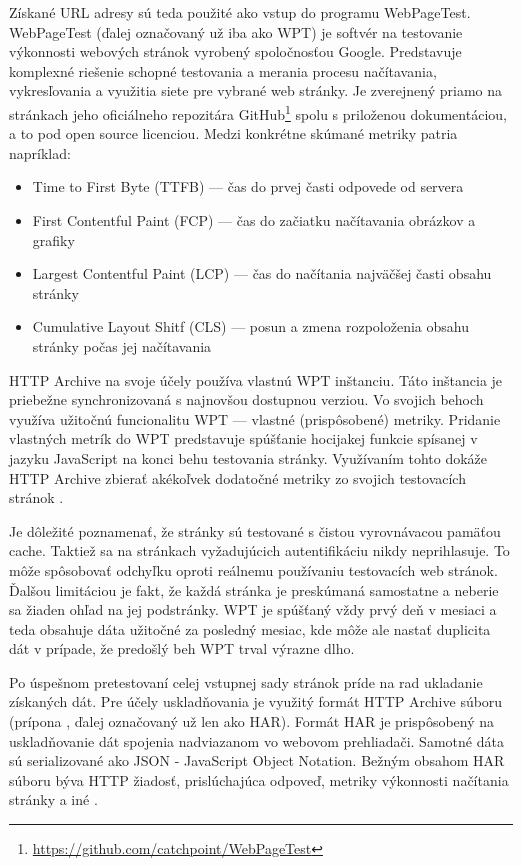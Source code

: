 Získané URL adresy sú teda použité ako vstup do programu WebPageTest. WebPageTest (ďalej označovaný už iba ako WPT) je softvér na testovanie výkonnosti webových stránok vyrobený spoločnosťou Google. Predstavuje komplexné riešenie schopné testovania a merania procesu načítavania, vykresľovania a využitia siete pre vybrané web stránky. 
Je zverejnený priamo na stránkach jeho oficiálneho repozitára GitHub\footnote{\href{https://github.com/catchpoint/WebPageTest}{https://github.com/catchpoint/WebPageTest}} spolu s priloženou dokumentáciou, a to pod open source licenciou.
Medzi konkrétne skúmané metriky patria napríklad: \cite{webpagetest}
\begin{itemize}
    \item Time to First Byte (TTFB) --- čas do prvej časti odpovede od servera
    \item First Contentful Paint (FCP) --- čas do začiatku načítavania obrázkov a grafiky
    \item Largest Contentful Paint (LCP) --- čas do načítania najväčšej časti obsahu stránky 
    \item Cumulative Layout Shitf (CLS) --- posun a zmena rozpoloženia obsahu stránky počas jej načítavania
\end{itemize}

HTTP Archive na svoje účely používa vlastnú WPT inštanciu. 
Táto inštancia je priebežne synchronizovaná s najnovšou dostupnou verziou.
Vo svojich behoch využíva užitočnú funcionalitu WPT --- vlastné (prispôsobené) metriky.
Pridanie vlastných metrík do WPT predstavuje spúšťanie hocijakej funkcie spísanej v jazyku JavaScript na konci behu testovania stránky. 
Využívaním tohto dokáže HTTP Archive zbierať akékoľvek dodatočné metriky zo svojich testovacích stránok \cite{webpagetest}.

Je dôležité poznamenať, že stránky sú testované s čistou vyrovnávacou pamäťou cache. Taktiež sa na stránkach vyžadujúcich autentifikáciu nikdy neprihlasuje.
To môže spôsobovať odchyľku oproti reálnemu používaniu testovacích web stránok. Ďalšou limitáciou je fakt, že každá stránka je preskúmaná samostatne a neberie sa žiaden ohľad na jej podstránky.
WPT je spúšťaný vždy prvý deň v mesiaci a teda obsahuje dáta užitočné za posledný mesiac, kde môže ale nastať duplicita dát v prípade, že predošlý beh WPT trval výrazne dlho.

Po úspešnom pretestovaní celej vstupnej sady stránok príde na rad ukladanie získaných dát.
Pre účely uskladňovania je využitý formát HTTP Archive súboru (prípona , ďalej označovaný už len ako HAR).
Formát HAR je prispôsobený na uskladňovanie dát spojenia nadviazanom vo webovom prehliadači. Samotné dáta sú serializované ako JSON - JavaScript Object Notation.
Bežným obsahom HAR súboru býva HTTP žiadosť, prislúchajúca odpoveď, metriky výkonnosti načítania stránky a iné \cite{httparchive-harfile}.

